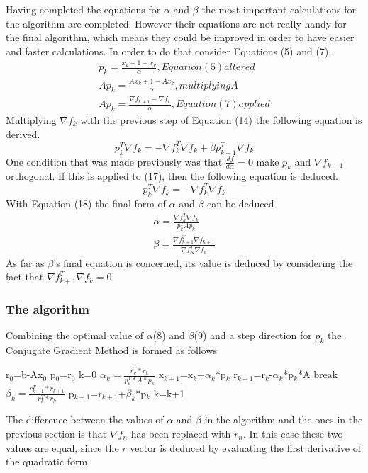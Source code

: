 \documentclass[12pt,a4paper]{article}
\begin{document}
Having completed the equations for $\alpha$ and $\beta$ the most important calculations for the algorithm are completed. However their equations are not really handy for the final algorithm, which means they could be improved in order to have easier and faster calculations. In order to do that consider Equations (5) and (7).
\begin{equation}
\begin{split}
p_k=\frac{x_k+1-x_k}{\alpha},Equation (5) altered\\
Ap_k=\frac{Ax_k+1-Ax_k}{\alpha}, multiplying A\\
Ap_k=\frac{\nabla f_{k+1}-\nabla f_k}{\alpha}, Equation (7) applied
\end{split}
\end{equation}
Multiplying $\nabla f_k$ with the previous step of Equation (14) the following equation is derived.
\begin{equation}
p_k^T\nabla f_k=-\nabla f_k^T\nabla f_k+\beta p_{k-1}^T\nabla f_k
\end{equation}
One condition that was made previously was that $\frac{df}{d\alpha}=0$ make $p_k$ and $\nabla f_{k+1}$ orthogonal. If this is applied to (17), then the following equation is deduced.
\begin{equation}
p_k^T\nabla f_k=-\nabla f_k^T\nabla f_k
\end{equation}
With Equation (18) the final form of $\alpha$ and $\beta$ can be deduced
\begin{equation}
\begin{split}
\alpha = \frac{\nabla f_k^T\nabla f_k}{p_k^TAp_k}\\
\beta=\frac{\nabla f_{k+1}^T\nabla f_{k+1}}{\nabla f_K^T\nabla f_k}
\end{split}
\end{equation}
As far as $\beta$'s final equation is concerned, its value is deduced by considering the fact that $\nabla f_{k+1}^T \nabla f_k=0$
\subsubsection{The algorithm}
Combining the optimal value of $\alpha$(8) and $\beta$(9) and a step direction for $p_k$ the Conjugate Gradient Method is formed as follows
\\
\begin{algorithmic}
\STATE r$_0$=b-Ax$_0$
\STATE p$_0$=r$_0$
\STATE k=0
\STATE $\alpha_k=\frac{r_k ^T*r_k}{p_k ^T*A*p_k}$
\STATE x$_{k+1}$=x$_k$+$\alpha_k$*p$_k$
\STATE r$_{k+1}$=r$_k$-$\alpha_k$*p$_k$*A
\STATE break
\ENDIF
\STATE $\beta_k=\frac{r_{k+1} ^T*r_{k+1}}{r_k ^T*r_k}$
\STATE p$_{k+1}$=r$_{k+1}$+$\beta_k$*p$_k$
\STATE k=k+1
\ENDFOR
\end{algorithmic}
\vspace{20pt}
The difference between the values of $\alpha$ and $\beta$ in the algorithm and the ones in the previous section is that $\nabla f_{n}$ has been replaced with $r_n$. In this case these two values are equal, since the $r$ vector is deduced by evaluating the first derivative of the quadratic form.
\end{document}
